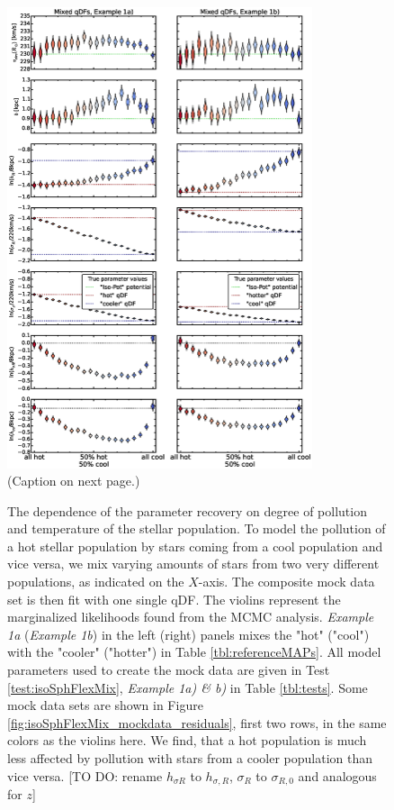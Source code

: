 \begin{figure}
\centering
\includegraphics[width=0.8\textwidth]{figs/isoSphFlexMixCont_violins.eps}
\caption{(Caption on next page.)}
\end{figure}


\addtocounter{figure}{-1}
\begin{figure} [t!]
\caption{The dependence of the parameter recovery on degree of pollution and temperature of the stellar population. To model the pollution of a hot stellar population by stars coming from a cool population and vice versa, we mix varying amounts of stars from two very different populations, as indicated on the $X$-axis. The composite mock data set is then fit with one single qDF. The violins represent the marginalized likelihoods found from the MCMC analysis. \emph{Example 1a} (\emph{Example 1b}) in the left (right) panels mixes the "hot" ("cool") \MAP with the "cooler" ("hotter") \MAP in Table \ref{tbl:referenceMAPs}. All model parameters used to create the mock data are given in Test \ref{test:isoSphFlexMix}, \emph{Example 1a) \& b)} in Table \ref{tbl:tests}. Some mock data sets are shown in Figure \ref{fig:isoSphFlexMix_mockdata_residuals}, first two rows, in the same colors as the violins here.  We find, that a hot population is much less affected by pollution with stars from a cooler population than vice versa. [TO DO: rename $h_{\sigma R}$ to $h_{\sigma,R}$, $\sigma_R$ to $\sigma_{R,0}$ and analogous for $z$]}
\label{fig:isoSphFlexMixCont}
\end{figure}



